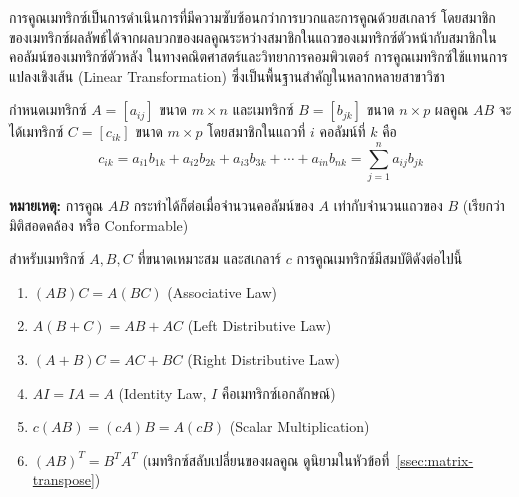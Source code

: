 การคูณเมทริกซ์เป็นการดำเนินการที่มีความซับซ้อนกว่าการบวกและการคูณด้วยสเกลาร์ โดยสมาชิกของเมทริกซ์ผลลัพธ์ได้จากผลบวกของผลคูณระหว่างสมาชิกในแถวของเมทริกซ์ตัวหน้ากับสมาชิกในคอลัมน์ของเมทริกซ์ตัวหลัง ในทางคณิตศาสตร์และวิทยาการคอมพิวเตอร์ การคูณเมทริกซ์ใช้แทนการแปลงเชิงเส้น (Linear Transformation) ซึ่งเป็นพื้นฐานสำคัญในหลากหลายสาขาวิชา

\begin{definition}
กำหนดเมทริกซ์ $A = [a_{ij}]$ ขนาด $m \times n$ และเมทริกซ์ $B = [b_{jk}]$ ขนาด $n \times p$ ผลคูณ $AB$ จะได้เมทริกซ์ $C = [c_{ik}]$ ขนาด $m \times p$ โดยสมาชิกในแถวที่ $i$ คอลัมน์ที่ $k$ คือ
\[
c_{ik} = a_{i1}b_{1k} + a_{i2}b_{2k} + a_{i3}b_{3k} + \cdots + a_{in}b_{nk} = \sum_{j=1}^{n} a_{ij}b_{jk}
\]
\end{definition}

\textbf{หมายเหตุ:} การคูณ $AB$ กระทำได้ก็ต่อเมื่อจำนวนคอลัมน์ของ $A$ เท่ากับจำนวนแถวของ $B$ (เรียกว่ามิติสอดคล้อง หรือ Conformable)

\begin{thrm}
สำหรับเมทริกซ์ $A, B, C$ ที่ขนาดเหมาะสม และสเกลาร์ $c$ การคูณเมทริกซ์มีสมบัติดังต่อไปนี้
\begin{enumerate}
    \item $(AB)C = A(BC)$ \hfill (Associative Law)
    \item $A(B + C) = AB + AC$ \hfill (Left Distributive Law)
    \item $(A + B)C = AC + BC$ \hfill (Right Distributive Law)
    \item $AI = IA = A$ \hfill (Identity Law, $I$ คือเมทริกซ์เอกลักษณ์)
    \item $c(AB) = (cA)B = A(cB)$ \hfill (Scalar Multiplication)
    \item $(AB)^T = B^T A^T$ \hfill (เมทริกซ์สลับเปลี่ยนของผลคูณ ดูนิยามในหัวข้อที่~\ref{ssec:matrix-transpose})
\end{enumerate}
\end{thrm}

